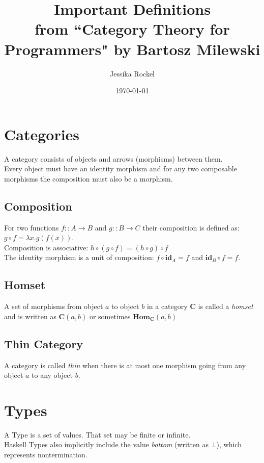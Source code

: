 \documentclass[12pt]{article}
\title{Important Definitions\\
\large from ``Category Theory for Programmers" by Bartosz Milewski}
\author{Jessika Rockel}
\date{\today}
\begin{document}
\maketitle

\section{Categories}
A category consists of objects and arrows (morphisms) between them. \\


Every object must have an identity morphism and for any two composable morphisms the composition must also be a morphism. 

\subsection{Composition}
For two functions $f :: A \rightarrow B$ and $g :: B \rightarrow C$ their composition is defined as: $g \circ f = \lambda x. g ( f (x))$.\\

Composition is associative: $h \circ (g \circ f) = (h \circ g) \circ f$ \\

The identity morphism is a unit of composition: $f \circ \mathbf{id}_A = f$ and $\mathbf{id}_B \circ f = f$.

\subsection{Homset}
A set of morphisms from object $a$ to object $b$ in a category \textbf{C} is called a \textit{homset} and is written as $\textbf{C}(a,b)$ or sometimes $\textbf{Hom}_{\textbf{C}}(a,b)$

\subsection{Thin Category}
A category is called \textit{thin} when there is at most one morphism going from any object $a$ to any object $b$.

\section{Types}
A Type is a set of values. That set may be finite or infinite. \\
Haskell Types also implicitly include the value \textit{bottom} (written as $\bot$), which represents nontermination.
\end{document}

